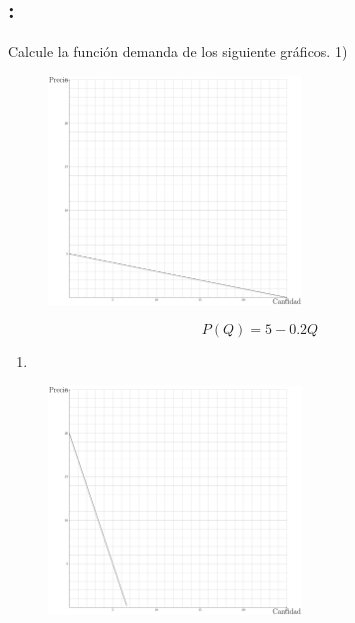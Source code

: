 \documentclass[
  letterpaper,
  DIV=11,
  numbers=noendperiod]{scrreport}
\providecommand{\tightlist}{%
  \setlength{\itemsep}{0pt}\setlength{\parskip}{0pt}}\usepackage{longtable,booktabs,array}
\begin{document}
\newpage

\hypertarget{section-27}{%
\subsection{:}\label{section-27}}

Calcule la función demanda de los siguiente gráficos. 1)

\begin{figure}

{\centering \includegraphics[width=0.6\textwidth,height=\textheight]{8ej_pauta_files/figure-pdf/unnamed-chunk-6-1.pdf}

}

\end{figure}

\[
P(Q)=5-0.2Q
\]

\newpage

\begin{enumerate}
\def\labelenumi{\arabic{enumi})}
\setcounter{enumi}{1}
\tightlist
\item
\end{enumerate}

\begin{figure}

{\centering \includegraphics[width=0.6\textwidth,height=\textheight]{8ej_pauta_files/figure-pdf/unnamed-chunk-7-1.pdf}

}

\end{figure}
\end{document}
